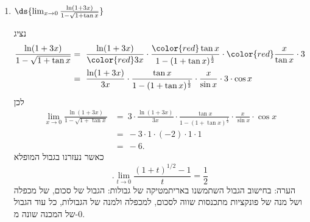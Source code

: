 \begin{enumerate}
\ifsol
{}
\begin{solbox}
נציג
\begin{align*}
    \frac{\sin^2 x}{1+ \cos^3 x}&=\ \frac{\sin^2(x-\pi+\pi)}{1+ \cos^3(x-\pi+\pi)}\\
    &=\ \frac{\sin^2(x-\pi)}{1-\cos^3(x-\pi)}.
\end{align*}
נסמן
$t=x-\pi$.
כאשר
$x$
שואף ל-
$\pi$,
$t$
שואף לאפס.
נמשיך להציג את הפונקציה בצורה נוחה יותר לטיפול:
\begin{align*}
    \frac{\sin^2(x-\pi)}{1-\cos^3(x-\pi)}=\frac{\sin^2t}{1-\cos^3t}
    = \frac{\sin^2t}{\color{red}t^2}\cdot\frac{\color{red}t^2}{1-\cos t}\cdot\frac{1}{\cos^2t+\cos t+1}
\end{align*}
נשים לב כי
כאשר
$x$
שואף ל-
$\pi$,
$t$
שואף לאפס,
מכאן
\begin{align*}
    \lim_{x \to {\pi}} \frac{\sin^2 x}{1+ \cos^3 x}&=\ \lim_{t\to0}\frac{\sin^2t}{\color{red}t^2}\cdot\frac{\color{red}t^2}{1-\cos t}\cdot\frac{1}{\cos^2t+\cos t+1}\\
    = 1\cdot2\cdot\frac{1}{3}
    = \frac{2}{3}.
\end{align*}
הערה: בחישוב הגבול השתמשנו באריתמטיקה של גבולות: הגבול של סכום, של מכפלה ושל מנה של פונקציות מתכנסות שווה לסכום, למכפלה ולמנה של הגבולות, כל עוד הגבול של המכנה שונה מ-$0$.
\end{solbox}
\fi

\item $\ds{ \lim_{x \to 0} \frac{\ln(1+3x)}{1 - \sqrt{1 + \tan x}}}$

\ifsol
{}
\begin{solbox}
נציג
\begin{align*}
    \frac{\ln(1+3x)}{1 - \sqrt{1 + \tan x}}&=\ \frac{\ln(1+3x)}{\color{red}3x}\cdot\frac{\color{red}\tan x}{1-(1+\tan x)^{\frac{1}{2}}}\cdot{\color{red}\frac{x}{\tan x}\cdot3}\\
    &=\ \frac{\ln(1+3x)}{3x}\cdot\frac{\tan x}{1-(1+\tan x)^{\frac{1}{2}}}\cdot{\frac{x}{\sin x}\cdot3\cdot\cos x}
\end{align*}
לכן
\begin{align*}
    \lim_{x\to0}\frac{\ln(1+3x)}{1 - \sqrt{1 + \tan x}}
    &=\ 3\cdot\frac{\ln(1+3x)}{3x}\cdot\frac{\tan x}{1-(1+\tan x)^{\frac{1}{2}}}\cdot{\frac{x}{\sin x}\cdot\cos x}\\
    &=\ -3\cdot1\cdot(-2)\cdot1\cdot1\\
    &=\ -6.
\end{align*}
כאשר נעזרנו בגבול המופלא
$$.\lim_{t\to0}
\frac{(1+t)^{1/2}-1}{t}=\frac12$$
הערה: בחישוב הגבול השתמשנו באריתמטיקה של גבולות: הגבול של סכום, של מכפלה ושל מנה של פונקציות מתכנסות שווה לסכום, למכפלה ולמנה של הגבולות, כל עוד הגבול של המכנה שונה מ-$0$.
\end{solbox}
\fi


\end{enumerate}
